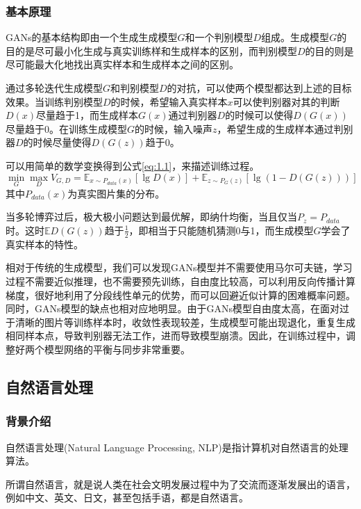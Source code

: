 \subsubsection{基本原理}
GANs的基本结构即由一个生成生成模型$G$和一个判别模型$D$组成。生成模型$G$的目的是尽可最小化生成与真实训练样和生成样本的区别，而判别模型$D$的目的则是尽可能最大化地找出真实样本和生成样本之间的区别。

通过多轮迭代生成模型$G$和判别模型$D$的对抗，可以使两个模型都达到上述的目标效果。当训练判别模型$D$的时候，希望输入真实样本$x$可以使判别器对其的判断$D(x)$尽量趋于1，而生成样本$G(x)$通过判别器$D$的时候可以使得$D(G(x))$尽量趋于0。在训练生成模型$G$的时候，输入噪声$z$，希望生成的生成样本通过判别器$D$的时候尽量使得$D(G(z))$趋于0。

可以用简单的数学变换得到公式\eqref{eq:1.1}，来描述训练过程。
\begin{equation}
    \label{eq:1.1}
    \min_{G}\max_{D} V_{G,D} = \mathbb{E}_{x \sim P_{data}(x)}[\lg D(x)] + \mathbb{E}_{z \sim P_{G}(z)}[\lg (1-D(G(z)))]
\end{equation}
其中$P_{data}(x)$为真实图片集的分布。

当多轮博弈过后，极大极小问题达到最优解，即纳什均衡，当且仅当$P_z = P_{data}$时。这时$\mathbb{E} D(G(z))$趋于$\frac{1}{2}$，即相当于只能随机猜测0与1，而生成模型$G$学会了真实样本的特性。

相对于传统的生成模型，我们可以发现GANs模型并不需要使用马尔可夫链，学习过程不需要近似推理，也不需要预先训练，自由度比较高，可以利用反向传播计算梯度，很好地利用了分段线性单元的优势，而可以回避近似计算的困难概率问题。同时，GANs模型的缺点也相对应地明显。由于GANs模型自由度太高，在面对过于清晰的图片等训练样本时，收敛性表现较差，生成模型可能出现退化，重复生成相同样本点，导致判别器无法工作，进而导致模型崩溃。因此，在训练过程中，调整好两个模型网络的平衡与同步非常重要。

\subsection{自然语言处理}
\subsubsection{背景介绍}
自然语言处理(Natural Language Processing, NLP)是指计算机对自然语言的处理算法。

所谓自然语言，就是说人类在社会文明发展过程中为了交流而逐渐发展出的语言，例如中文、英文、日文，甚至包括手语，都是自然语言。

